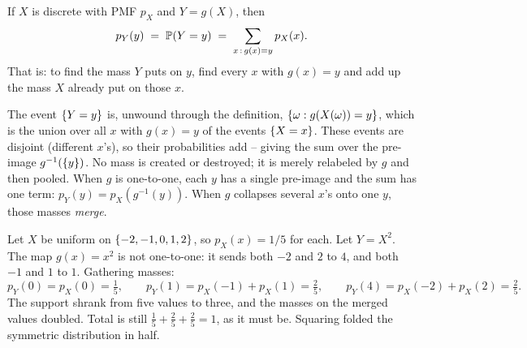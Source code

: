 \begin{proposition}
\label{ch06:prop-pmf-of-function}
If $X$ is discrete with PMF $p_X$ and $Y = g(X)$, then
\[
  p_Y(y) \;=\; \P(Y = y) \;=\; \sum_{x \,:\, g(x) = y} p_X(x).
\]
That is: to find the mass $Y$ puts on $y$, find every $x$ with $g(x) = y$ and add up
the mass $X$ already put on those $x$.
\end{proposition}

\begin{whybox}
The event $\set{Y = y}$ is, unwound through the definition,
$\set{\omega : g(X(\omega)) = y}$, which is the union over all $x$ with $g(x) = y$ of
the events $\set{X = x}$. These events are disjoint (different $x$'s), so their
probabilities add -- giving the sum over the pre-image $g^{-1}(\set{y})$. No mass is
created or destroyed; it is merely relabeled by $g$ and then pooled. When $g$ is
one-to-one, each $y$ has a single pre-image and the sum has one term:
$p_Y(y) = p_X(g^{-1}(y))$. When $g$ collapses several $x$'s onto one $y$, those masses
\emph{merge}.
\end{whybox}

\begin{example}
\label{ch06:ex-square}
Let $X$ be uniform on $\set{-2,-1,0,1,2}$, so $p_X(x) = 1/5$ for each. Let
$Y = X^2$. The map $g(x) = x^2$ is not one-to-one: it sends both $-2$ and $2$ to $4$,
and both $-1$ and $1$ to $1$. Gathering masses:
\[
  p_Y(0) = p_X(0) = \tfrac{1}{5}, \qquad
  p_Y(1) = p_X(-1) + p_X(1) = \tfrac{2}{5}, \qquad
  p_Y(4) = p_X(-2) + p_X(2) = \tfrac{2}{5}.
\]
The support shrank from five values to three, and the masses on the merged values
doubled. Total is still $\tfrac{1}{5} + \tfrac{2}{5} + \tfrac{2}{5} = 1$, as it must
be. Squaring folded the symmetric distribution in half.
\end{example}

